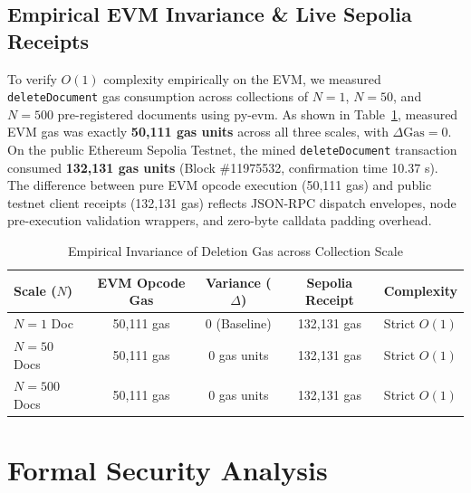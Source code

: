 \documentclass[journal,10pt,twocolumn]{IEEEtran}
\begin{document}
\subsection{Empirical EVM Invariance \& Live Sepolia Receipts}
To verify $O(1)$ complexity empirically on the EVM, we measured \texttt{deleteDocument} gas consumption across collections of $N = 1$, $N = 50$, and $N = 500$ pre-registered documents using py-evm. As shown in Table~\ref{tab:invariance}, measured EVM gas was exactly \textbf{50,111 gas units} across all three scales, with $\Delta\text{Gas} = 0$. On the public Ethereum Sepolia Testnet, the mined \texttt{deleteDocument} transaction consumed \textbf{132,131 gas units} (Block \#11975532, confirmation time 10.37 s). The difference between pure EVM opcode execution (50,111 gas) and public testnet client receipts (132,131 gas) reflects JSON-RPC dispatch envelopes, node pre-execution validation wrappers, and zero-byte calldata padding overhead.

\begin{table}[t]
\caption{Empirical Invariance of Deletion Gas across Collection Scale}
\label{tab:invariance}
\centering
\begin{tabular}{lcccc}
\toprule
\textbf{Scale ($N$)} & \textbf{EVM Opcode Gas} & \textbf{Variance ($\Delta$)} & \textbf{Sepolia Receipt} & \textbf{Complexity} \\
\midrule
$N = 1$ Doc & 50,111 gas & 0 (Baseline) & 132,131 gas & Strict $O(1)$ \\
$N = 50$ Docs & 50,111 gas & 0 gas units & 132,131 gas & Strict $O(1)$ \\
$N = 500$ Docs & 50,111 gas & 0 gas units & 132,131 gas & Strict $O(1)$ \\
\bottomrule
\end{tabular}
\end{table}

\section{Formal Security Analysis}
\end{document}
